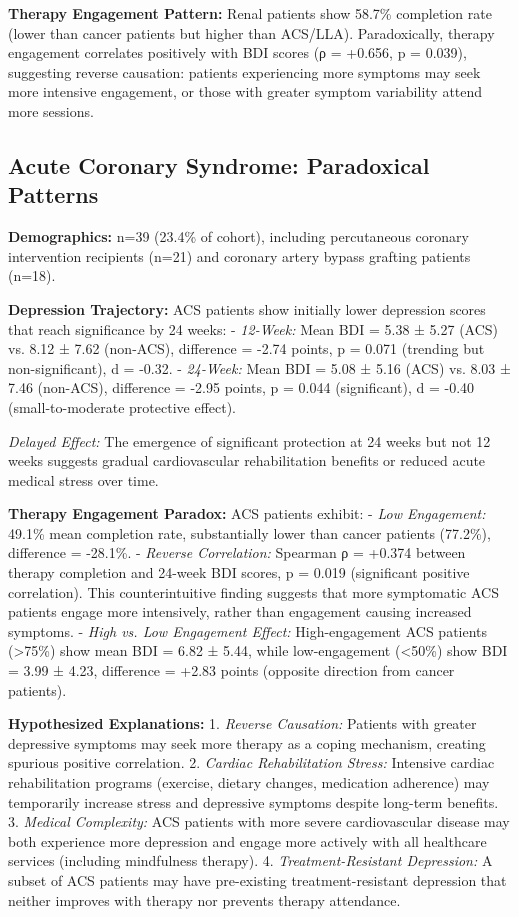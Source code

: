 \documentclass[conference]{IEEEtran}
\begin{document}
\textbf{Therapy Engagement Pattern:} Renal patients show 58.7\% completion rate (lower than cancer patients but higher than ACS/LLA). Paradoxically, therapy engagement correlates positively with BDI scores (ρ = +0.656, p = 0.039), suggesting reverse causation: patients experiencing more symptoms may seek more intensive engagement, or those with greater symptom variability attend more sessions.

\subsection{Acute Coronary Syndrome: Paradoxical Patterns}

\textbf{Demographics:} n=39 (23.4\% of cohort), including percutaneous coronary intervention recipients (n=21) and coronary artery bypass grafting patients (n=18).

\textbf{Depression Trajectory:} ACS patients show initially lower depression scores that reach significance by 24 weeks:
- \textit{12-Week:} Mean BDI = 5.38 ± 5.27 (ACS) vs. 8.12 ± 7.62 (non-ACS), difference = -2.74 points, p = 0.071 (trending but non-significant), d = -0.32.
- \textit{24-Week:} Mean BDI = 5.08 ± 5.16 (ACS) vs. 8.03 ± 7.46 (non-ACS), difference = -2.95 points, p = 0.044 (significant), d = -0.40 (small-to-moderate protective effect).

\textit{Delayed Effect:} The emergence of significant protection at 24 weeks but not 12 weeks suggests gradual cardiovascular rehabilitation benefits or reduced acute medical stress over time.

\textbf{Therapy Engagement Paradox:} ACS patients exhibit:
- \textit{Low Engagement:} 49.1\% mean completion rate, substantially lower than cancer patients (77.2\%), difference = -28.1\%.
- \textit{Reverse Correlation:} Spearman ρ = +0.374 between therapy completion and 24-week BDI scores, p = 0.019 (significant positive correlation). This counterintuitive finding suggests that more symptomatic ACS patients engage more intensively, rather than engagement causing increased symptoms.
- \textit{High vs. Low Engagement Effect:} High-engagement ACS patients (>75\%) show mean BDI = 6.82 ± 5.44, while low-engagement (<50\%) show BDI = 3.99 ± 4.23, difference = +2.83 points (opposite direction from cancer patients).

\textbf{Hypothesized Explanations:}
1. \textit{Reverse Causation:} Patients with greater depressive symptoms may seek more therapy as a coping mechanism, creating spurious positive correlation.
2. \textit{Cardiac Rehabilitation Stress:} Intensive cardiac rehabilitation programs (exercise, dietary changes, medication adherence) may temporarily increase stress and depressive symptoms despite long-term benefits.
3. \textit{Medical Complexity:} ACS patients with more severe cardiovascular disease may both experience more depression and engage more actively with all healthcare services (including mindfulness therapy).
4. \textit{Treatment-Resistant Depression:} A subset of ACS patients may have pre-existing treatment-resistant depression that neither improves with therapy nor prevents therapy attendance.
\end{document}
